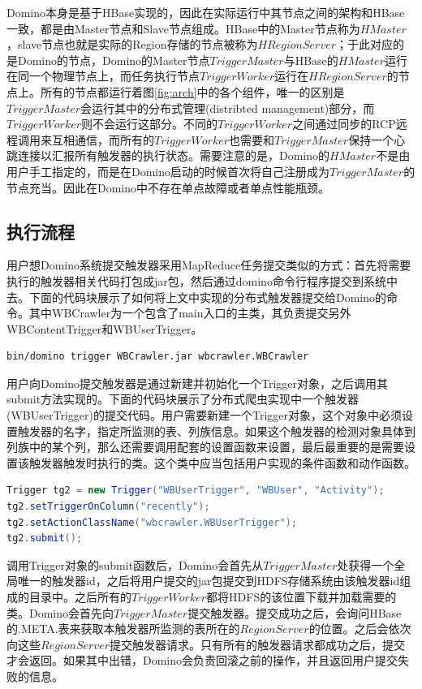Domino本身是基于HBase实现的，因此在实际运行中其节点之间的架构和HBase一致，都是由Master节点和Slave节点组成。HBase中的Master节点称为$HMaster$，slave节点也就是实际的Region存储的节点被称为$HRegionServer$；于此对应的是Domino的节点，Domino的Master节点$TriggerMaster$与HBase的$HMaster$运行在同一个物理节点上，而任务执行节点$TriggerWorker$运行在$HRegionServer$的节点上。所有的节点都运行着图\ref{fig:arch}中的各个组件，唯一的区别是$TriggerMaster$会运行其中的分布式管理(distribted management)部分，而$TriggerWorker$则不会运行这部分。不同的$TriggerWorker$之间通过同步的RCP远程调用来互相通信，而所有的$TriggerWorker$也需要和$TriggerMaster$保持一个心跳连接以汇报所有触发器的执行状态。需要注意的是，Domino的$HMaster$不是由用户手工指定的，而是在Domino启动的时候首次将自己注册成为$TriggerMaster$的节点充当。因此在Domino中不存在单点故障或者单点性能瓶颈。

\subsection{执行流程}
用户想Domino系统提交触发器采用MapReduce任务提交类似的方式：首先将需要执行的触发器相关代码打包成jar包，然后通过domino命令行程序提交到系统中去。下面的代码块展示了如何将上文中实现的分布式触发器提交给Domino的命令。其中WBCrawler为一个包含了main入口的主类，其负责提交另外WBContentTrigger和WBUserTrigger。
\begin{lstlisting}[language=bash]
	bin/domino trigger WBCrawler.jar wbcrawler.WBCrawler
\end{lstlisting}

用户向Domino提交触发器是通过新建并初始化一个Trigger对象，之后调用其submit方法实现的。下面的代码块展示了分布式爬虫实现中一个触发器(WBUserTrigger)的提交代码。用户需要新建一个Trigger对象，这个对象中必须设置触发器的名字，指定所监测的表、列族信息。如果这个触发器的检测对象具体到列族中的某个列，那么还需要调用配套的设置函数来设置，最后最重要的是需要设置该触发器触发时执行的类。这个类中应当包括用户实现的条件函数和动作函数。

\begin{lstlisting}[language=java]
Trigger tg2 = new Trigger("WBUserTrigger", "WBUser", "Activity");
tg2.setTriggerOnColumn("recently");
tg2.setActionClassName("wbcrawler.WBUserTrigger");
tg2.submit();
\end{lstlisting}

调用Trigger对象的submit函数后，Domino会首先从$TriggerMaster$处获得一个全局唯一的触发器id，之后将用户提交的jar包提交到HDFS存储系统由该触发器id组成的目录中。之后所有的$TriggerWorker$都将HDFS的该位置下载并加载需要的类。Domino会首先向$TriggerMaster$提交触发器。提交成功之后，会询问HBase的.META.表来获取本触发器所监测的表所在的$RegionServer$的位置。之后会依次向这些$RegionServer$提交触发器请求。只有所有的触发器请求都成功之后，提交才会返回。如果其中出错，Domino会负责回滚之前的操作，并且返回用户提交失败的信息。

